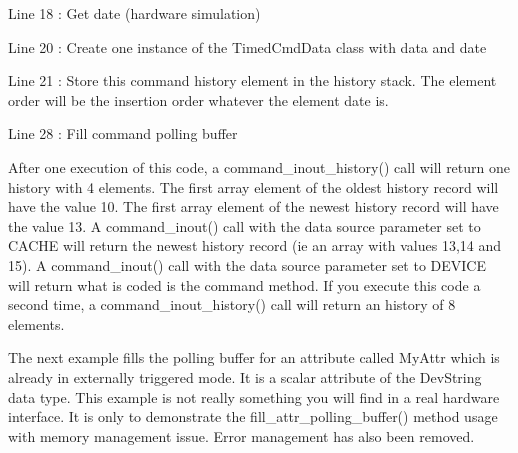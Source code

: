 Line 18 : Get date (hardware simulation)

Line 20 : Create one instance of the TimedCmdData class with data
and date

Line 21 : Store this command history element in the history stack.
The element order will be the insertion order whatever the element
date is.

Line 28 : Fill command polling buffer

After one execution of this code, a command\_inout\_history() call
will return one history with 4 elements. The first array element of
the oldest history record will have the value 10. The first array
element of the newest history record will have the value 13. A command\_inout()
call with the data source parameter set to CACHE will return the newest
history record (ie an array with values 13,14 and 15). A command\_inout()
call with the data source parameter set to DEVICE will return what
is coded is the command method. If you execute this code a second
time, a command\_inout\_history() call will return an history of 8
elements.

The next example fills the polling buffer for an attribute called
MyAttr which is already in externally triggered mode. It is a scalar
attribute of the DevString data type. This example is not really something
you will find in a real hardware interface. It is only to demonstrate
the fill\_attr\_polling\_buffer() method usage with memory management
issue. Error management has also been removed.

